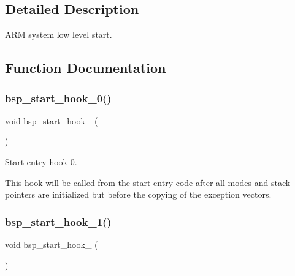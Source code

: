 \subsection{Detailed Description}
A\+RM system low level start. 



\subsection{Function Documentation}
\mbox{\label{group__arm__start_ga602d4a8ecc07d3a91dea3ab2c98d9230}} 
\subsubsection{\texorpdfstring{bsp\_start\_hook\_0()}{bsp\_start\_hook\_0()}}
{\footnotesize\ttfamily void bsp\+\_\+start\+\_\+hook\+\_ (\begin{DoxyParamCaption}\item[{B\+S\+P\+\_\+\+S\+T\+A\+R\+T\+\_\+\+H\+O\+O\+K\+S\+\_\+\+L\+O\+A\+D\+E\+R\+\_\+\+A\+R\+GS}]{ }\end{DoxyParamCaption})}



Start entry hook 0. 

This hook will be called from the start entry code after all modes and stack pointers are initialized but before the copying of the exception vectors. \mbox{\label{group__arm__start_ga24d1f6d59718fe0808feaa76747d82a8}} 
\subsubsection{\texorpdfstring{bsp\_start\_hook\_1()}{bsp\_start\_hook\_1()}}
{\footnotesize\ttfamily void bsp\+\_\+start\+\_\+hook\+\_ (\begin{DoxyParamCaption}\item[{B\+S\+P\+\_\+\+S\+T\+A\+R\+T\+\_\+\+H\+O\+O\+K\+S\+\_\+\+L\+O\+A\+D\+E\+R\+\_\+\+A\+R\+GS}]{ }\end{DoxyParamCaption})}



